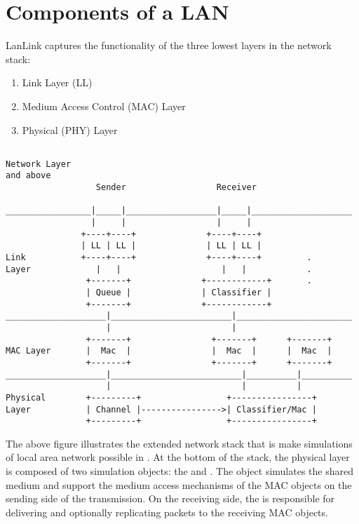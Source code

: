 \section{Components of a LAN}
\label{sec:lan_components}

LanLink captures the functionality of the three lowest layers in the
network stack:

\begin{enumerate}
\item
	Link Layer (LL)
\item
	Medium Access Control (MAC) Layer
\item
	Physical (PHY) Layer
\end{enumerate}


\begin{verbatim}

Network Layer
and above
                  Sender                  Receiver

_________________|_____|__________________|_____|____________________
                 |     |                  |     |
               +----+----+              +----+----+
               | LL | LL |              | LL | LL |
Link           +----+----+              +----+----+         .
Layer             |   |                    |   |            .
                +-------+              +------------+       .
                | Queue |              | Classifier |
                +-------+              +------------+
____________________|________________________|_______________________
                    |                        |
                +-------+                +-------+      +-------+
MAC Layer       |  Mac  |                |  Mac  |      |  Mac  |
                +-------+                +-------+      +-------+
____________________|__________________________|__________|__________
                    |                          |          |
Physical        +---------+                 +----------------+
Layer           | Channel |---------------->| Classifier/Mac |
                +---------+                 +----------------+

\end{verbatim}

The above figure illustrates the extended network stack that is make
simulations of local area network possible in \ns.  At the bottom of the
stack, the physical layer is composed of two simulation objects: the
 and .  The  object
simulates the shared medium and support the medium access mechanisms of
the MAC objects on the sending side of the transmission.  On the
receiving side, the  is responsible for delivering
and optionally replicating packets to the receiving MAC objects.

